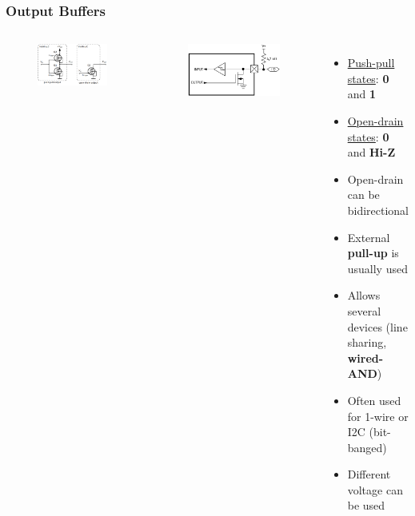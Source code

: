 \documentclass[aspectratio=169,usenames,dvipsnames]{beamer}
\begin{document}
\begin{frame}
  \frametitle{Output Buffers}
  \begin{columns}
      \vspace*{-2mm}
      \begin{figure}
        \centering
        \includegraphics[scale=5]{images/outputs.png}
      \end{figure}
      \vspace*{-5mm}
      \begin{figure}
        \centering
        \includegraphics[scale=0.25]{images/open-drain-io.png}
      \end{figure}
      \vspace*{-10mm}
      \begin{itemize}
        \item \underline{Push-pull states}: \textbf{0} and \textbf{1}
        \item \underline {Open-drain states}: \textbf{0} and \textbf{Hi-Z}
        \item Open-drain can be bidirectional
        \item External \textbf{pull-up} is usually used
        \item Allows several devices (line sharing, \textbf{wired-AND})
        \item Often used for 1-wire or I2C (bit-banged)
        \item Different voltage can be used
      \end{itemize}
  \end{columns}
\end{frame}
\end{document}
